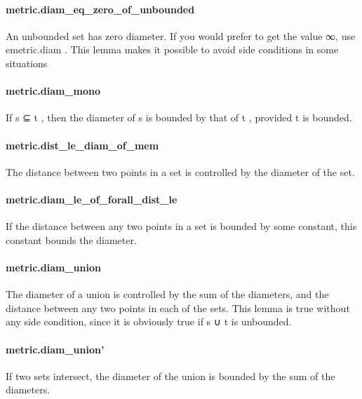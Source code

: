 \documentclass{article}
\begin{document}
\paragraph{metric.diam\_eq\_zero\_of\_unbounded}
\par
An unbounded set has zero diameter. If you would prefer to get the value ∞, use 
\colorbox[RGB]{253,246,227}{{{{\color[RGB]{101, 123, 131} emetric.diam }}}}.
This lemma makes it possible to avoid side conditions in some situations
\paragraph{metric.diam\_mono}
\par
If 
\colorbox[RGB]{253,246,227}{{{{\color[RGB]{101, 123, 131} s ⊆ t }}}}, then the diameter of 
\colorbox[RGB]{253,246,227}{{{{\color[RGB]{101, 123, 131} s }}}} is bounded by that of 
\colorbox[RGB]{253,246,227}{{{{\color[RGB]{101, 123, 131} t }}}}, provided 
\colorbox[RGB]{253,246,227}{{{{\color[RGB]{101, 123, 131} t }}}} is bounded.
\paragraph{metric.dist\_le\_diam\_of\_mem}
\par
The distance between two points in a set is controlled by the diameter of the set.
\paragraph{metric.diam\_le\_of\_forall\_dist\_le}
\par
If the distance between any two points in a set is bounded by some constant, this constant
bounds the diameter.
\paragraph{metric.diam\_union}
\par
The diameter of a union is controlled by the sum of the diameters, and the distance between
any two points in each of the sets. This lemma is true without any side condition, since it is
obviously true if 
\colorbox[RGB]{253,246,227}{{{{\color[RGB]{101, 123, 131} s ∪ t }}}} is unbounded.
\paragraph{metric.diam\_union'}
\par
If two sets intersect, the diameter of the union is bounded by the sum of the diameters.
\end{document}
